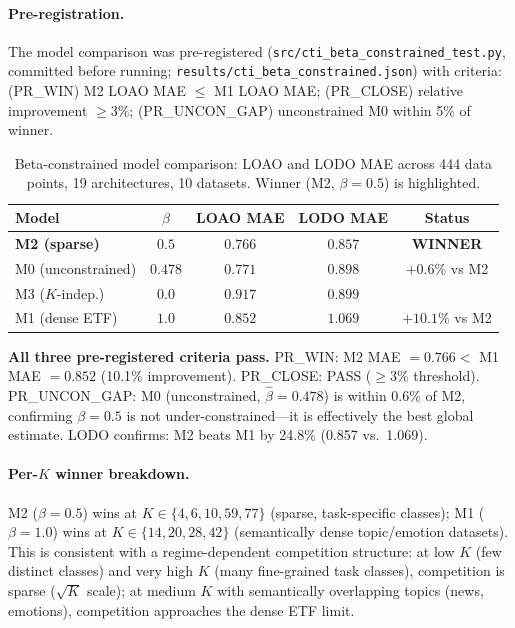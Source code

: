 \documentclass{article}
\begin{document}
\paragraph{Pre-registration.} The model comparison was pre-registered (\texttt{src/cti\_beta\_constrained\_test.py},
committed before running; \texttt{results/cti\_beta\_constrained.json}) with criteria: (PR\_WIN) M2 LOAO MAE $\leq$ M1 LOAO MAE; (PR\_CLOSE) relative improvement $\geq 3\%$; (PR\_UNCON\_GAP) unconstrained M0 within 5\% of winner.

\begin{table}[t]
\centering
\caption{Beta-constrained model comparison: LOAO and LODO MAE across 444 data points,
19 architectures, 10 datasets. Winner (M2, $\beta=0.5$) is highlighted.}
\label{tab:beta-constrained}
\small
\begin{tabular}{lcccc}
\toprule
Model & $\beta$ & LOAO MAE & LODO MAE & Status \\
\midrule
\textbf{M2 (sparse)} & $\mathbf{0.5}$ & $\mathbf{0.766}$ & $\mathbf{0.857}$ & \textbf{WINNER} \\
M0 (unconstrained) & $0.478$ & $0.771$ & $0.898$ & $+0.6\%$ vs M2 \\
M3 ($K$-indep.) & $0.0$ & $0.917$ & $0.899$ & \\
M1 (dense ETF) & $1.0$ & $0.852$ & $1.069$ & $+10.1\%$ vs M2 \\
\bottomrule
\end{tabular}
\end{table}

\textbf{All three pre-registered criteria pass.} PR\_WIN: M2 MAE $= 0.766 < $ M1 MAE $= 0.852$ (10.1\% improvement). PR\_CLOSE: PASS ($\geq 3\%$ threshold). PR\_UNCON\_GAP: M0 (unconstrained, $\hat\beta=0.478$) is within 0.6\% of M2, confirming $\beta=0.5$ is not under-constrained---it is effectively the best global estimate. LODO confirms: M2 beats M1 by 24.8\% (0.857 vs.\ 1.069).

\paragraph{Per-$K$ winner breakdown.}
M2 ($\beta=0.5$) wins at $K \in \{4, 6, 10, 59, 77\}$ (sparse, task-specific classes);
M1 ($\beta=1.0$) wins at $K \in \{14, 20, 28, 42\}$ (semantically dense topic/emotion datasets).
This is consistent with a regime-dependent competition structure: at low $K$ (few distinct classes) and very high $K$ (many fine-grained task classes), competition is sparse ($\sqrt{K}$ scale); at medium $K$ with semantically overlapping topics (news, emotions), competition approaches the dense ETF limit.
\end{document}
